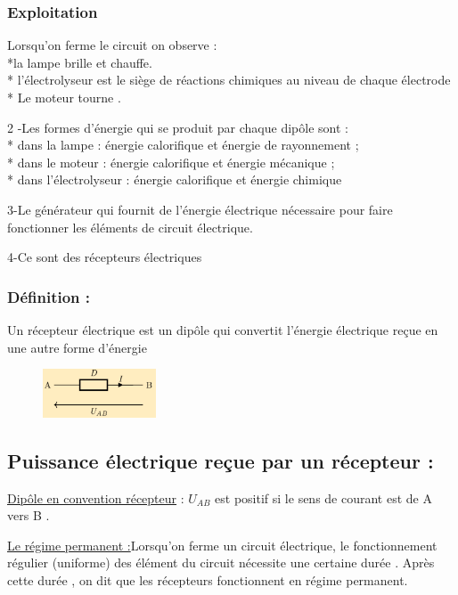 \documentclass[12pt]{article}
\begin{document}
\subsubsection{Exploitation}
Lorsqu’on ferme le circuit on observe :
\\ *la lampe brille et chauffe.
\\ * l’électrolyseur est le siège de réactions chimiques au niveau de
chaque électrode
\\ * Le moteur tourne .
\vspace{.2cm}

2 -Les formes d’énergie qui se produit par chaque dipôle sont :
\\ * dans la lampe : énergie calorifique et énergie de
rayonnement ;
\\ * dans le moteur : énergie calorifique et énergie mécanique ;
\\ * dans l’électrolyseur : énergie calorifique et énergie chimique
\vspace{.2cm}

3-Le générateur qui fournit de l’énergie électrique nécessaire
pour faire fonctionner les éléments de circuit électrique.

4-Ce sont des récepteurs électriques

\subsubsection{Définition :}
Un récepteur électrique est un dipôle qui convertit l’énergie
électrique reçue en une autre forme d’énergie
\begin{figure}
    \includegraphics[width=0.3\textwidth]{./img/img_01.png}
\end{figure}


\subsection{Puissance électrique reçue par un récepteur :}
\underline{Dipôle en convention récepteur} 
: $U_{AB}$ est positif si le sens de
courant est de A vers B .

\underline{Le régime permanent :}Lorsqu’on ferme un circuit électrique, le fonctionnement
régulier (uniforme) des élément du circuit nécessite une
certaine durée . Après cette durée , on dit que les récepteurs
fonctionnent en régime permanent.
\end{document}

